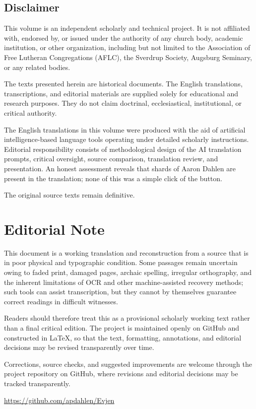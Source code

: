 \subsection{Disclaimer}

This volume is an independent scholarly and technical project. It is not affiliated with, endorsed by, or issued under the authority of any church body, academic institution, or other organization, including but not limited to the Association of Free Lutheran Congregations (AFLC), the Sverdrup Society, Augsburg Seminary, or any related bodies.

The texts presented herein are historical documents. The English translations, transcriptions, and editorial materials are supplied solely for educational and research purposes. They do not claim doctrinal, ecclesiastical, institutional, or critical authority.

The English translations in this volume were produced with the aid of artificial intelligence-based language tools operating under detailed scholarly instructions. Editorial responsibility consists of methodological design of the AI translation prompts, critical oversight, source comparison, translation review, and presentation. An honest assessment reveals that shards of Aaron Dahlen are present in the translation; none of this was a simple click of the button.

The original source texts remain definitive.


\section*{Editorial Note}

This document is a working translation and reconstruction from a source that is in poor physical and typographic condition. Some passages remain uncertain owing to faded print, damaged pages, archaic spelling, irregular orthography, and the inherent limitations of OCR and other machine-assisted recovery methods; such tools can assist transcription, but they cannot by themselves guarantee correct readings in difficult witnesses.

Readers should therefore treat this as a provisional scholarly working text rather than a final critical edition. The project is maintained openly on GitHub and constructed in \LaTeX, so that the text, formatting, annotations, and editorial decisions may be revised transparently over time.

Corrections, source checks, and suggested improvements are welcome through the project repository on GitHub, where revisions and editorial decisions may be tracked transparently.


\url{https://github.com/apdahlen/Evjen}

